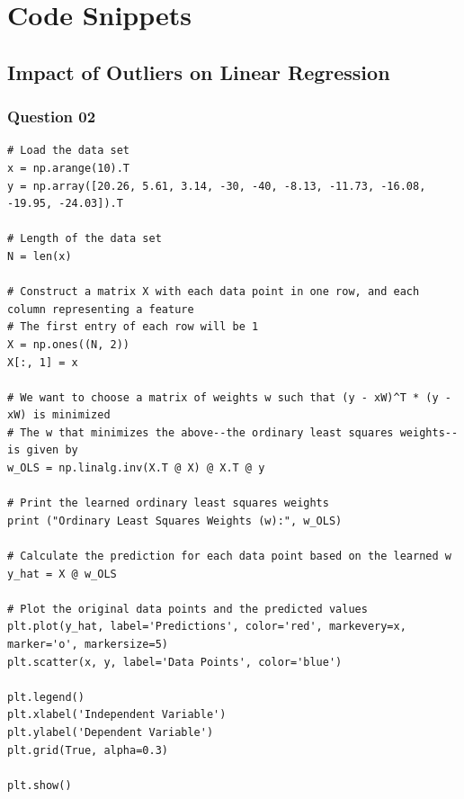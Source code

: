 \documentclass{article}[a4paper]
\begin{document}
	\appendix
	\section{Code Snippets}
	\label{code}
		
	\subsection{Impact of Outliers on Linear Regression}

	\subsubsection{Question 02}
	\begin{lstlisting}[label={q1_2_code}, caption={Ordinary Least Squares Regression and Plots}]
# Load the data set
x = np.arange(10).T
y = np.array([20.26, 5.61, 3.14, -30, -40, -8.13, -11.73, -16.08, -19.95, -24.03]).T

# Length of the data set
N = len(x)

# Construct a matrix X with each data point in one row, and each column representing a feature
# The first entry of each row will be 1
X = np.ones((N, 2))
X[:, 1] = x

# We want to choose a matrix of weights w such that (y - xW)^T * (y - xW) is minimized
# The w that minimizes the above--the ordinary least squares weights--is given by
w_OLS = np.linalg.inv(X.T @ X) @ X.T @ y

# Print the learned ordinary least squares weights
print ("Ordinary Least Squares Weights (w):", w_OLS)

# Calculate the prediction for each data point based on the learned w
y_hat = X @ w_OLS

# Plot the original data points and the predicted values
plt.plot(y_hat, label='Predictions', color='red', markevery=x, marker='o', markersize=5)
plt.scatter(x, y, label='Data Points', color='blue')

plt.legend()
plt.xlabel('Independent Variable')
plt.ylabel('Dependent Variable')
plt.grid(True, alpha=0.3)

plt.show()
	\end{lstlisting}
\end{document}
